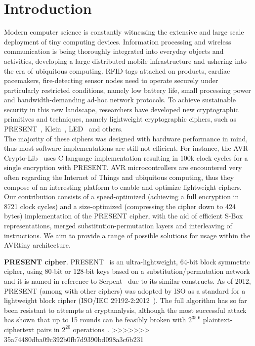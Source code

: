 \documentclass[11pt]{article}
\begin{document}
\section{Introduction}
Modern computer science is constantly witnessing the extensive and large scale deployment of tiny computing devices. Information processing and wireless communication is being thoroughly integrated into everyday objects and activities, developing a large distributed mobile infrastructure and ushering into the era of ubiquitous computing. RFID tags attached on products, cardiac pacemakers, fire-detecting sensor nodes need to operate securely under particularly restricted conditions, namely low battery life, small processing power and bandwidth-demanding ad-hoc network protocols. To achieve sustainable security in this new landscape, researchers have developed new cryptographic primitives and techniques, namely lightweight cryptographic ciphers, such as PRESENT~\cite{bogdanov2007present}, Klein~\cite{gong2012klein}, LED~\cite{guo2011led} and others.\\
The majority of these ciphers was designed with hardware performance in mind, thus most software implementations are still not efficient. For instance, the AVR-Crypto-Lib~\cite{avr_crypto_lib} uses C language implementation resulting in 100k clock cycles for a single encryption with PRESENT. AVR microcontrollers are encountered very often regarding the Internet of Things and ubiquitous computing, thus they compose of an interesting platform to enable and optimize lightweight ciphers. Our contribution consists of a speed-optimized (achieving  a full encryption in 8721 clock cycles) and a size-optimized (compressing the cipher down to 424 bytes)  implementation of the PRESENT cipher, with the aid of efficient S-Box representations, merged substitution-permutation layers and interleaving of instructions. We aim to provide a range of possible solutions for usage within the AVRtiny architecture.

\textbf{PRESENT cipher}. PRESENT~\cite{bogdanov2007present} is an ultra-lightweight, 64-bit block symmetric cipher, using 80-bit or 128-bit keys based on a substitution/permutation network and it is named in reference to Serpent~\cite{anderson1998serpent} due to its similar constructs.
As of 2012, PRESENT (among with other ciphers) was adopted by ISO as a standard for a lightweight block cipher (ISO/IEC 29192-2:2012~\cite{present_iso}). The full algorithm has so far been resistant to attempts at cryptanalysis, although the most successful attack has shown that up to 15 rounds can be feasibly broken with $2^{35.6}$ plaintext-ciphertext pairs in $2^{20}$ operations~\cite{abed2012biclique,collard2009statistical,nakahara2009linear}.
>>>>>>> 35a74480dba09c392b0fb7d9390bd098a3c6b231
\end{document}
